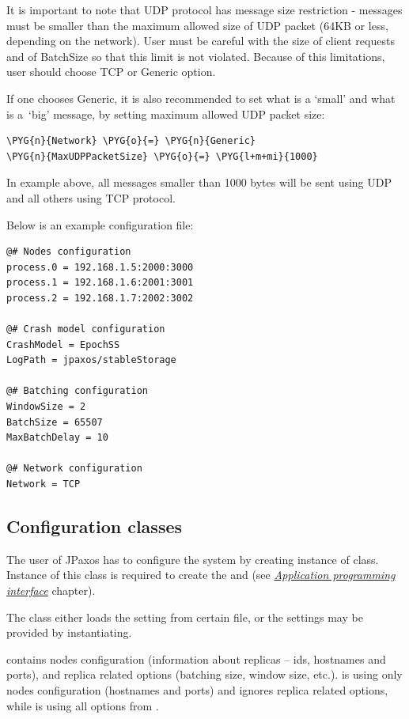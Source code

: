 It is important to note that UDP protocol has message size restriction -
messages must be smaller than the maximum allowed size of UDP packet (64KB or
less, depending on the network). User must be careful with the size of client
requests and of BatchSize so that this limit is not violated. Because of this
limitations, user should choose TCP or Generic option.

If one chooses Generic, it is also recommended to set what is a `small' and
what is a~`big' message, by setting maximum allowed UDP packet size:

\begin{Verbatim}[commandchars=\\\{\}]
\PYG{n}{Network} \PYG{o}{=} \PYG{n}{Generic}
\PYG{n}{MaxUDPPacketSize} \PYG{o}{=} \PYG{l+m+mi}{1000}
\end{Verbatim}

In example above, all messages smaller than 1000 bytes will be sent using UDP
and all others using TCP protocol.

\label{config:example-file}

Below is an example configuration file:

\begin{Verbatim}[commandchars=@\[\]]
@# Nodes configuration
process.0 = 192.168.1.5:2000:3000
process.1 = 192.168.1.6:2001:3001
process.2 = 192.168.1.7:2002:3002

@# Crash model configuration
CrashModel = EpochSS
LogPath = jpaxos/stableStorage

@# Batching configuration
WindowSize = 2
BatchSize = 65507
MaxBatchDelay = 10

@# Network configuration
Network = TCP
\end{Verbatim}


\subsection{Configuration classes}
\label{config:configuration-classes}
The user of JPaxos has to configure the system by creating instance of
 class. Instance of this class is required to create the
 and  (see {\hyperref[api:jpaxos-api]{\emph{Application programming interface}}} chapter).

The  class either loads the setting from certain file, or the
settings may be provided by instantiating.

 contains nodes configuration (information about replicas -- ids,
hostnames and ports), and replica related options (batching size, window size,
etc.).  is using only nodes configuration (hostnames and ports) and
ignores replica related options, while  is using all options from
.

